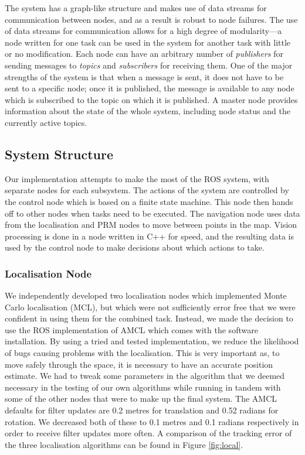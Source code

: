 \documentclass[conference]{IEEEtran}
\begin{document}
The system has a graph-like structure and makes use of data streams for communication between nodes, and as a result is robust to node failures. The use of data streams for communication allows for a high degree of modularity---a node written for one task can be used in the system for another task with little or no modification. Each node can have an arbitrary number of \emph{publishers} for sending messages to \emph{topics} and \emph{subscribers} for receiving them. One of the major strengths of the system is that when a message is sent, it does not have to be sent to a specific node; once it is published, the message is available to any node which is subscribed to the topic on which it is published. A  master node provides information about the state of the whole system, including node status and the currently active topics.

\subsection{System Structure}
Our implementation attempts to make the most of the ROS system, with separate nodes for each subsystem. The actions of the system are controlled by the control node which is based on a finite state machine. This node then hands off to other nodes when tasks need to be executed. The navigation node uses data from the localisation and PRM nodes to move between points in the map. Vision processing is done in a node written in C++ for speed, and the resulting data is used by the control node to make decisions about which actions to take.

\subsubsection{Localisation Node}
We independently developed two localisation nodes which implemented Monte Carlo localisation (MCL), but which were not sufficiently error free that we were confident in using them for the combined task. Instead, we made the decision to use the ROS implementation of AMCL which comes with the software installation. By using a tried and tested implementation, we reduce the likelihood of bugs causing problems with the localisation. This is very important as, to move safely through the space, it is necessary to have an accurate position estimate. We had to tweak some parameters in the algorithm that we deemed necessary in the testing of our own algorithms while running in tandem with some of the other nodes that were to make up the final system. The AMCL defaults for filter updates are 0.2 metres for translation and 0.52 radians for rotation. We decreased both of these to 0.1 metres and 0.1 radians respectively in order to receive filter updates more often. A comparison of the tracking error of the three localisation algorithms can be found in Figure \ref{fig:local}.
\end{document}

